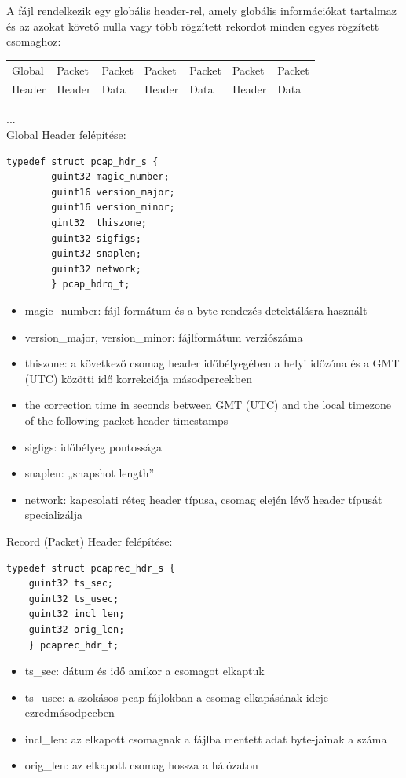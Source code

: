 \documentclass[a4paper,12pt,oneside]{report}
\begin{document}
A fájl rendelkezik egy globális header-rel, amely globális információkat
tartalmaz és az azokat követő nulla vagy több rögzített rekordot minden egyes
rögzített csomaghoz:
\\

\begin{tabular}{|l|l|l|l|l|l|l|}
\hline
    Global & Packet & Packet & Packet & Packet & Packet & Packet\\
    Header & Header & Data & Header & Data & Header & Data\\
\hline
\end{tabular}
...
\\

Global Header felépítése:

\begin{lstlisting}
typedef struct pcap_hdr_s {
        guint32 magic_number;
        guint16 version_major;
        guint16 version_minor;
        gint32  thiszone;
        guint32 sigfigs;
        guint32 snaplen;
        guint32 network;
        } pcap_hdrq_t;
\end{lstlisting}
        
\begin{itemize}
\itemsep0em
        \item magic\_number: fájl formátum és a byte rendezés detektálásra használt
        \item version\_major, version\_minor: fájlformátum verziószáma
        \item thiszone: a következő csomag header időbélyegében a helyi időzóna és
a GMT (UTC) közötti idő korrekciója másodpercekben
        \item the correction time in seconds between GMT (UTC) and the local
timezone of the following packet header timestamps
        \item sigfigs: időbélyeg pontossága
        \item snaplen: „snapshot length”
        \item network: kapcsolati réteg header típusa, csomag elején lévő header
típusát specializálja
\end{itemize}

Record (Packet) Header felépítése:

\begin{lstlisting}
typedef struct pcaprec_hdr_s {
    guint32 ts_sec;
    guint32 ts_usec;
    guint32 incl_len;
    guint32 orig_len;
    } pcaprec_hdr_t;
\end{lstlisting}

\begin{itemize}
\itemsep0em
    \item ts\_sec: dátum és idő amikor a csomagot elkaptuk
    \item ts\_usec: a szokásos pcap fájlokban a csomag elkapásának ideje
ezredmásodpecben
    \item incl\_len: az elkapott csomagnak a fájlba mentett adat byte-jainak a
száma
    \item orig\_len: az elkapott csomag hossza a hálózaton
\end{itemize}
\end{document}
